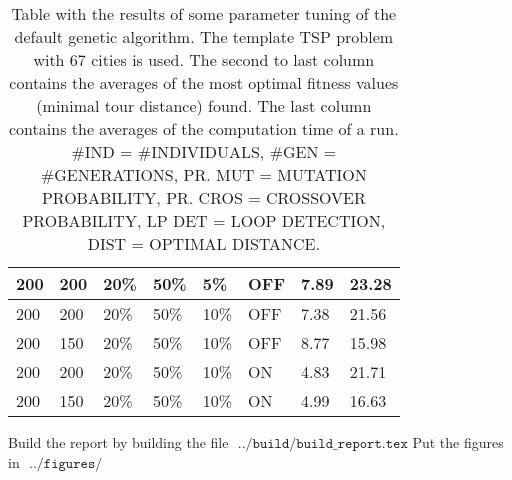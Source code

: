 \begin{table}[!]
\begin{tabular}{ | l | l | l | l | l | l | l | l | }
	200 & 200 & 20\% & 50\% & 5\% & OFF & 7.89 & 23.28 \\ \hline
	200 & 200 & 20\% & 50\% & 10\% & OFF & 7.38 & 21.56 \\ \hline
	200 & 150 & 20\% & 50\% & 10\% & OFF & 8.77 & 15.98 \\ \hline
	200 & 200 & 20\% & 50\% & 10\% & ON & 4.83 & 21.71 \\ \hline
	200 & 150 & 20\% & 50\% & 10\% & ON & 4.99 & 16.63 \\ \hline
\end{tabular}
\caption{Table with the results of some parameter tuning of the default genetic algorithm. The template TSP problem with $67$ cities is used. The second to last column contains the averages of the most optimal fitness values (minimal tour distance) found. The last column contains the averages of the computation time of a run. \#IND = \#INDIVIDUALS, \#GEN = \#GENERATIONS, PR. MUT = MUTATION PROBABILITY, PR. CROS = CROSSOVER PROBABILITY, LP DET = LOOP DETECTION, DIST = OPTIMAL DISTANCE. }
\label{table:question_2}
\end{table}


Build the report by building the file $\texttt{ ../build/build\_report.tex}$
\newline
\newline
Put the figures in $\texttt{ ../figures/ }$